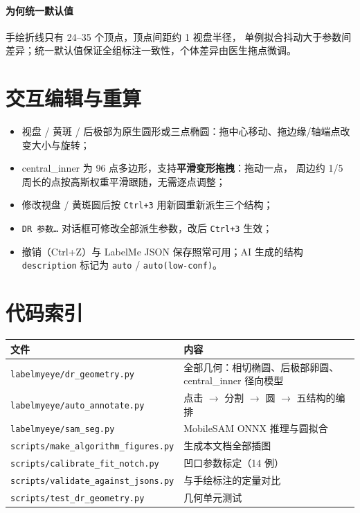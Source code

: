 \documentclass[11pt,a4paper,fontset=windows]{ctexart}
\begin{document}
\paragraph{为何统一默认值}手绘折线只有 24--35 个顶点，顶点间距约 1 视盘半径，
单例拟合抖动大于参数间差异；统一默认值保证全组标注一致性，个体差异由医生拖点微调。

\section{交互编辑与重算}

\begin{itemize}
\item 视盘 / 黄斑 / 后极部为原生圆形或三点椭圆：拖中心移动、拖边缘/轴端点改变大小与旋转；
\item central\_inner 为 96 点多边形，支持\textbf{平滑变形拖拽}：拖动一点，
周边约 1/5 周长的点按高斯权重平滑跟随，无需逐点调整；
\item 修改视盘 / 黄斑圆后按 \texttt{Ctrl+3} 用新圆重新派生三个结构；
\item \texttt{DR 参数…} 对话框可修改全部派生参数，改后 \texttt{Ctrl+3} 生效；
\item 撤销（Ctrl+Z）与 LabelMe JSON 保存照常可用；AI 生成的结构
\texttt{description} 标记为 \texttt{auto} / \texttt{auto(low-conf)}。
\end{itemize}

\section{代码索引}

\begin{center}
\begin{tabular}{ll}
\toprule
文件 & 内容 \\
\midrule
\texttt{labelmyeye/dr\_geometry.py} & 全部几何：相切椭圆、后极部卵圆、central\_inner 径向模型 \\
\texttt{labelmyeye/auto\_annotate.py} & 点击 $\to$ 分割 $\to$ 圆 $\to$ 五结构的编排 \\
\texttt{labelmyeye/sam\_seg.py} & MobileSAM ONNX 推理与圆拟合 \\
\texttt{scripts/make\_algorithm\_figures.py} & 生成本文档全部插图 \\
\texttt{scripts/calibrate\_fit\_notch.py} & 凹口参数标定（14 例） \\
\texttt{scripts/validate\_against\_jsons.py} & 与手绘标注的定量对比 \\
\texttt{scripts/test\_dr\_geometry.py} & 几何单元测试 \\
\bottomrule
\end{tabular}
\end{center}
\end{document}
